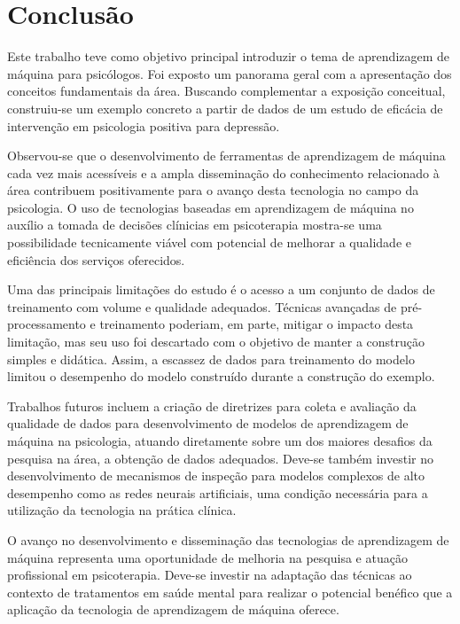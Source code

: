 \chapter{Conclusão}

Este trabalho teve como objetivo principal introduzir o tema de aprendizagem de máquina para psicólogos. Foi exposto
um panorama geral com a apresentação dos conceitos fundamentais da área. Buscando complementar a exposição conceitual,
construiu-se um exemplo concreto a partir de dados de um estudo de eficácia de intervenção em psicologia positiva para
depressão.

Observou-se que o desenvolvimento de ferramentas de aprendizagem de máquina cada vez mais acessíveis e a ampla disseminação
do conhecimento relacionado à área contribuem positivamente para o avanço desta tecnologia no campo da psicologia. O uso de
tecnologias baseadas em aprendizagem de máquina no auxílio a tomada de decisões clínicias em psicoterapia mostra-se uma
possibilidade tecnicamente viável com potencial de melhorar a qualidade e eficiência dos serviços oferecidos.

Uma das principais limitações do estudo é o acesso a um conjunto de dados de treinamento com volume e qualidade adequados.
Técnicas avançadas de pré-processamento e treinamento poderiam, em parte, mitigar o impacto desta limitação, mas seu uso foi
descartado com o objetivo de manter a construção simples e didática. Assim, a escassez de dados para treinamento do modelo
limitou o desempenho do modelo construído durante a construção do exemplo.

Trabalhos futuros incluem a criação de diretrizes para coleta e avaliação da qualidade de dados para desenvolvimento de modelos de
aprendizagem de máquina na psicologia, atuando diretamente sobre um dos maiores desafios da pesquisa na área, a obtenção de dados
adequados. Deve-se também investir no desenvolvimento de mecanismos de inspeção para modelos complexos de alto desempenho como as
redes neurais artificiais, uma condição necessária para a utilização da tecnologia na prática clínica.

O avanço no desenvolvimento e disseminação das tecnologias de aprendizagem de máquina representa uma oportunidade de melhoria
na pesquisa e atuação profissional em psicoterapia. Deve-se investir na adaptação das técnicas ao contexto de tratamentos em saúde
mental para realizar o potencial benéfico que a aplicação da tecnologia de aprendizagem de máquina oferece.